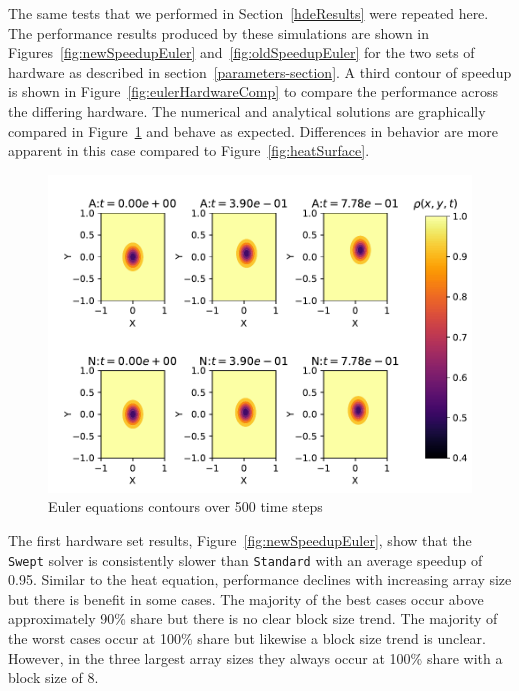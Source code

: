\documentclass[review]{elsarticle}
\def\Swept{\texttt{Swept}}
\def\Standard{\texttt{Standard}}
\begin{document}
The same tests that we performed in Section~\ref{hdeResults} were repeated here. The performance results produced by these simulations are shown in Figures~\ref{fig:newSpeedupEuler} and~\ref{fig:oldSpeedupEuler} for the two sets of hardware as described in section~\ref{parameters-section}. A third contour of speedup is shown in Figure~\ref{fig:eulerHardwareComp} to compare the performance across the differing hardware. The numerical and analytical solutions are graphically compared in Figure~\ref{fig:eulerSurface} and behave as expected. Differences in behavior are more apparent in this case compared to Figure~\ref{fig:heatSurface}. 

\begin{figure}[htb!]
    \centering
    \includegraphics{figs/eulerValidate.pdf}
    \caption{Euler equations contours over 500 time steps}
    \label{fig:eulerSurface}
\end{figure}

The first hardware set results, Figure~\ref{fig:newSpeedupEuler}, show that the \Swept{} solver is consistently slower than \Standard{} with an average speedup of 0.95. Similar to the heat equation, performance declines with increasing array size but there is benefit in some cases. The majority of the best cases occur above approximately 90\% share but there is no clear block size trend. The majority of the worst cases occur at 100\% share but likewise a block size trend is unclear. However, in the three largest array sizes they always occur at 100\% share with a block size of 8.
\end{document}
